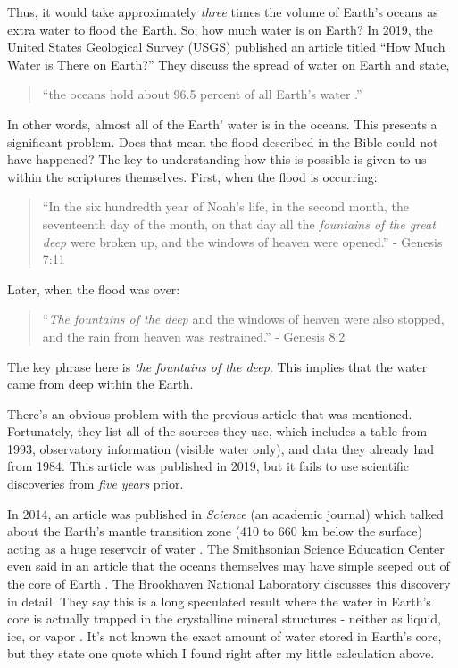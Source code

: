 \documentclass[10pt]{article}
\begin{document}
\begin{multicols}{2}
Thus, it would take approximately \textit{three} times the volume of Earth's oceans as extra water to flood the Earth. So, how much water is on Earth? In 2019, the United States Geological Survey (USGS) published an article titled ``How Much Water is There on Earth?'' They discuss the spread of water on Earth and state,
\begin{quotation}
\noindent``the oceans hold about 96.5 percent of all Earth's water \cite{ocean water}.'' 
\end{quotation}
In other words, almost all of the Earth' water is in the oceans. This presents a significant problem. Does that mean the flood described in the Bible could not have happened? The key to understanding how this is possible is given to us within the scriptures themselves. First, when the flood is occurring:
\begin{quotation}
\noindent``In the six hundredth year of Noah’s life, in the second month, the seventeenth day of the month, on that day all the \textit{fountains of the great deep} were broken up, and the windows of heaven were opened.'' - Genesis 7:11
\end{quotation}
Later, when the flood was over:
\begin{quotation}
\noindent``\textit{The fountains of the deep} and the windows of heaven were also stopped, and the rain from heaven was restrained.'' - Genesis 8:2
\end{quotation}
The key phrase here is \textit{the fountains of the deep}. This implies that the water came from deep within the Earth.

There's an obvious problem with the previous article that was mentioned. Fortunately, they list all of the sources they use, which includes a table from 1993, observatory information (visible water only), and data they already had from 1984. This article was published in 2019, but it fails to use scientific discoveries from \textit{five years} prior.

In 2014, an article was published in \textit{Science} (an academic journal) which talked about the Earth's mantle transition zone (410 to 660 km below the surface) acting as a huge reservoir of water \cite{mantle water}. The Smithsonian Science Education Center even said in an article that the oceans themselves may have simple seeped out of the core of Earth \cite{ocean below feet}. The Brookhaven National Laboratory discusses this discovery in detail. They say this is a long speculated result where the water in Earth's core is actually trapped in the crystalline mineral structures - neither as liquid, ice, or vapor \cite{deep earth water}. It's not known the exact amount of water stored in Earth's core, but they state one quote which I found right after my little calculation above.


\end{multicols}
\end{document}
